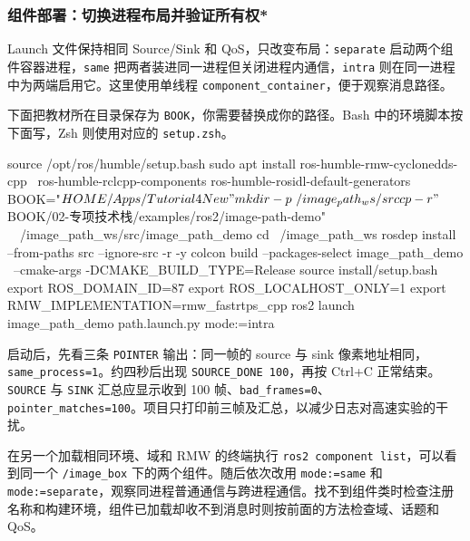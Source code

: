 \subsubsection{组件部署：切换进程布局并验证所有权*}
\label{sec:ros2-image-deployment}
\begin{example}
Launch 文件保持相同 Source/Sink 和 QoS，只改变布局：\texttt{separate} 启动两个组件容器进程，\texttt{same} 把两者装进同一进程但关闭进程内通信，\texttt{intra} 则在同一进程中为两端启用它。这里使用单线程 \texttt{component\_container}，便于观察消息路径。


下面把教材所在目录保存为 \texttt{BOOK}，你需要替换成你的路径。Bash 中的环境脚本按下面写，Zsh 则使用对应的 \texttt{setup.zsh}。
\par\medskip\noindent\begin{minipage}{\linewidth}
\begin{tbash}
source /opt/ros/humble/setup.bash
sudo apt install ros-humble-rmw-cyclonedds-cpp \
  ros-humble-rclcpp-components ros-humble-rosidl-default-generators
BOOK="$HOME/Apps/Tutorial4New"
mkdir -p ~/image_path_ws/src
cp -r "$BOOK/02-专项技术栈/examples/ros2/image-path-demo" \
  ~/image_path_ws/src/image_path_demo
cd ~/image_path_ws
rosdep install --from-paths src --ignore-src -r -y
colcon build --packages-select image_path_demo \
  --cmake-args -DCMAKE_BUILD_TYPE=Release
source install/setup.bash
export ROS_DOMAIN_ID=87
export ROS_LOCALHOST_ONLY=1
export RMW_IMPLEMENTATION=rmw_fastrtps_cpp
ros2 launch image_path_demo path.launch.py mode:=intra
\end{tbash}
\end{minipage}\par\smallskip
启动后，先看三条 \texttt{POINTER} 输出：同一帧的 source 与 sink 像素地址相同，\texttt{same\_process=1}。约四秒后出现 \texttt{SOURCE\_DONE 100}，再按 Ctrl+C 正常结束。\texttt{SOURCE} 与 \texttt{SINK} 汇总应显示收到 100 帧、\texttt{bad\_frames=0}、\texttt{pointer\_matches=100}。项目只打印前三帧及汇总，以减少日志对高速实验的干扰。

在另一个加载相同环境、域和 RMW 的终端执行 \texttt{ros2 component list}，可以看到同一个 \texttt{/image\_box} 下的两个组件。随后依次改用 \texttt{mode:=same} 和 \texttt{mode:=separate}，观察同进程普通通信与跨进程通信。找不到组件类时检查注册名称和构建环境，组件已加载却收不到消息时则按前面的方法检查域、话题和 QoS。


\end{example}
